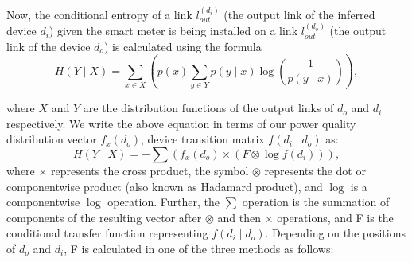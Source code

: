 Now, the conditional entropy of a link $l_{out}^{(d_i)}$ (the output link of the inferred device $d_i$) given the smart meter is being installed on a link $l_{out}^{(d_o)}$ (the output link of the device $d_o$) is calculated using the formula \[H(Y \mid X) = \sum_{x \in X} \left( p(x) \sum_{y \in Y} p(y \mid x) \log (\frac{1}{p(y \mid x)})\right),\]

\noindent where $X$ and $Y$ are the distribution functions of the output links of $d_o$ and $d_i$ respectively. We write the above equation in terms of our power quality distribution vector $f_x(d_o)$, device transition matrix $f(d_i \mid d_o)$ as:
\[H(Y \mid X) = - \sum \left( f_x(d_o) \times \left(F \otimes \log f(d_i)\right)  \right), \]
\noindent where $\times$ represents the cross product, the symbol $\otimes$ represents the dot or componentwise product (also known as Hadamard product), and $\log$ is a componentwise $\log$ operation. Further, the $\sum$ operation is the summation of components of the resulting vector after $\otimes$ and then $\times$ operations, and F is the conditional transfer function representing $f(d_i \mid d_o)$.  Depending on the positions of $d_o$ and $d_i$, F is calculated in one of the three methods as follows:


